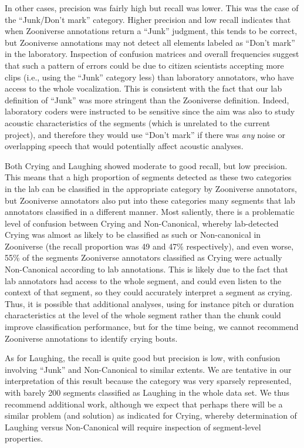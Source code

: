 \documentclass[english,,man]{apa6}
\begin{document}
In other cases, precision was fairly high but recall was lower. This was the case of the \enquote{Junk/Don't mark} category. Higher precision and low recall indicates that when Zooniverse annotations return a \enquote{Junk} judgment, this tends to be correct, but Zooniverse annotations may not detect all elements labeled as \enquote{Don't mark} in the laboratory. Inspection of confusion matrices and overall frequencies suggest that such a pattern of errors could be due to citizen scientists accepting more clips (i.e., using the \enquote{Junk} category less) than laboratory annotators, who have access to the whole vocalization. This is consistent with the fact that our lab definition of \enquote{Junk} was more stringent than the Zooniverse definition. Indeed, laboratory coders were instructed to be sensitive since the aim was also to study acoustic characteristics of the segments (which is unrelated to the current project), and therefore they would use \enquote{Don't mark} if there was \emph{any} noise or overlapping speech that would potentially affect acoustic analyses.

Both Crying and Laughing showed moderate to good recall, but low precision. This means that a high proportion of segments detected as these two categories in the lab can be classified in the appropriate category by Zooniverse annotators, but Zooniverse annotators also put into these categories many segments that lab annotators classified in a different manner. Most saliently, there is a problematic level of confusion between Crying and Non-Canonical, whereby lab-detected Crying was almost as likely to be classified as such or Non-canonical in Zooniverse (the recall proportion was 49 and 47\% respectively), and even worse, 55\% of the segments Zooniverse annotators classified as Crying were actually Non-Canonical according to lab annotations. This is likely due to the fact that lab annotators had access to the whole segment, and could even listen to the context of that segment, so they could accurately interpret a segment as crying. Thus, it is possible that additional analyses, using for instance pitch or duration characteristics at the level of the whole segment rather than the chunk could improve classification performance, but for the time being, we cannot recommend Zooniverse annotations to identify crying bouts.

As for Laughing, the recall is quite good but precision is low, with confusion involving \enquote{Junk} and Non-Canonical to similar extents. We are tentative in our interpretation of this result because the category was very sparsely represented, with barely 200 segments classified as Laughing in the whole data set. We thus recommend additional work, although we expect that perhaps there will be a similar problem (and solution) as indicated for Crying, whereby determination of Laughing versus Non-Canonical will require inspection of segment-level properties.
\end{document}
